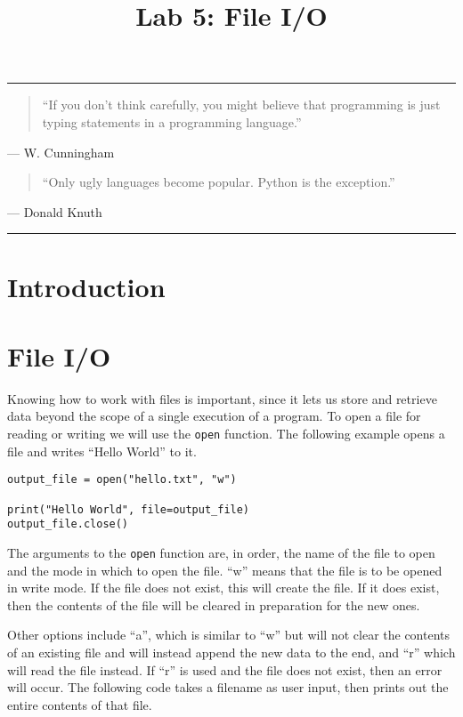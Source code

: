 \documentclass[11pt]{cselabheader}
\title{Lab 5: File I/O}
\begin{document}
\maketitle

\hrule
\begin{quotation}
  ``If you don't think carefully, you might believe that programming is just
  typing statements in a programming language.''
\end{quotation}
\begin{flushright}
  --- W. Cunningham
\end{flushright}

\begin{quotation}
  ``Only ugly languages become popular. Python is the exception.''
\end{quotation}
\begin{flushright}
  --- Donald Knuth
\end{flushright}

\hrule

\section{Introduction}


\section{File I/O}
Knowing how to work with files is important, since it lets us store and retrieve data beyond the scope of a single execution of a program. To open a file for reading or writing we will use the \lstinline{open} function. The following example opens a file and writes ``Hello World'' to it.

\begin{lstlisting}[style=python]
output_file = open("hello.txt", "w")

print("Hello World", file=output_file)
output_file.close()
\end{lstlisting}

The arguments to the \lstinline{open} function are, in order, the name of the file to open and the mode in which to open the file. ``w'' means that the file is to be opened in write mode. If the file does not exist, this will create the file. If it does exist, then the contents of the file will be cleared in preparation for the new ones.

Other options include ``a'', which is similar to ``w'' but will not clear the contents of an existing file and will instead append the new data to the end, and ``r'' which will read the file instead. If ``r'' is used and the file does not exist, then an error will occur. The following code takes a filename as user input, then prints out the entire contents of that file.
\end{document}
